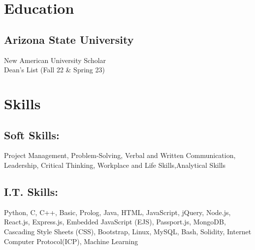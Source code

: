 \documentclass[a4paper]{deedy-resume} %
\begin{document}
\begin{minipage}[t]{0.33\textwidth} %


\section{Education} 



\subsection{Arizona State University}


\textbullet{} New American University Scholar \\
\textbullet{} Dean's List (Fall 22 \& Spring 23)



\sectionspace %




\section{Skills}

\subsection{Soft Skills:}

Project Management, Problem-Solving, Verbal and Written Communication, Leadership, Critical Thinking, Workplace and Life Skills,Analytical Skills


\sectionspace %


\subsection{I.T. Skills:}

Python, C, C++, Basic, Prolog, Java, HTML, JavaScript, jQuery, Node.js, React.js, Express.js, Embedded JavaScript (EJS),
Passport.js, MongoDB, Cascading Style Sheets (CSS), Bootstrap, Linux, MySQL, Bash, Solidity, Internet Computer Protocol(ICP), Machine
Learning



\end{minipage}
\end{document}
